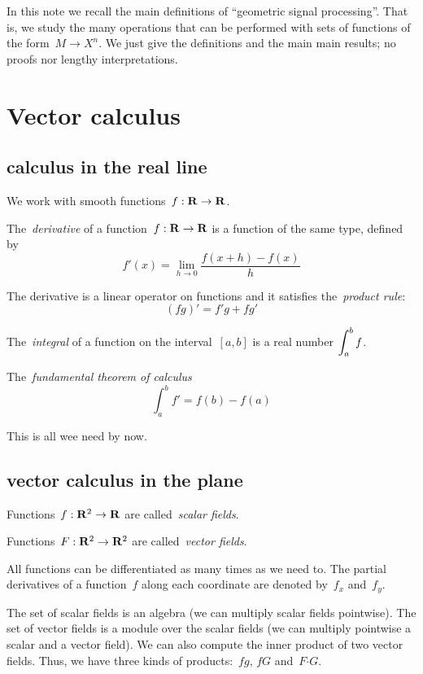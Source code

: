 In this note we recall the main definitions of ``geometric signal
processing''. That is, we study the many operations that can be performed with
sets of functions of the form~$M\to X^n$.  We just give the definitions and
the main main results; no proofs nor lengthy interpretations.


\clearpage
\section{Vector calculus}

\subsection{calculus in the real line}

We work with smooth functions~$f:\mathbf{R}\to\mathbf{R}$.

The~\emph{derivative} of a function~$f:\mathbf{R}\to\mathbf{R}$ is a function of the same
type, defined by
\[
	f'(x)=\lim_{h\to 0}\frac{f(x+h)-f(x)}h
\]


The derivative is a linear operator on functions and it satisfies
the~\emph{product rule}:
\[
	(fg)'=f'g+fg'
\]

The~\emph{integral} of a function on the interval~$[a,b]$ is a real number
$\displaystyle \int_a^bf$.

The~\emph{fundamental theorem of calculus}
\[
	\int_a^bf'=f(b)-f(a)
\]

This is all wee need by now.


\subsection{vector calculus in the plane}

Functions~$f:\mathbf{R}^2\to\mathbf{R}$ are called~\emph{scalar fields}.

Functions~$F:\mathbf{R}^2\to\mathbf{R}^2$ are called~\emph{vector fields}.

All functions can be differentiated as many times as we need to.  The partial
derivatives of a function~$f$ along each coordinate are denoted by~$f_x$
and~$f_y$.

The set of scalar fields is an algebra (we can multiply scalar fields
pointwise).  The set of vector fields is a module over the scalar fields (we
can multiply pointwise a scalar and a vector field).  We can also compute the
inner product of two vector fields.  Thus, we have three kinds of
products:~$fg$, $fG$ and~$F\boldsymbol{\cdot}G$.

